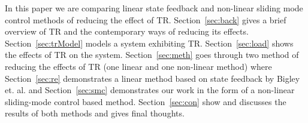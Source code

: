 In this paper we are comparing linear state feedback and non-linear sliding mode control methods of reducing the effect of TR.
Section~\ref{sec:back} gives a brief overview of TR and the contemporary ways of reducing its effects.
Section~\ref{sec:trModel} models a system exhibiting TR. 
Section~\ref{sec:load} shows the effects of TR on the system.
Section~\ref{sec:meth} goes through two method of reducing the effects of TR (one linear and one non-linear method) where
Section~\ref{sec:re} demonstrates a linear method based on state feedback by Bigley et. al. and
Section~\ref{sec:smc} demonstrates our work in the form of a non-linear sliding-mode control based method.
Section~\ref{sec:con} show and discusses the results of both methods and gives final thoughts.


